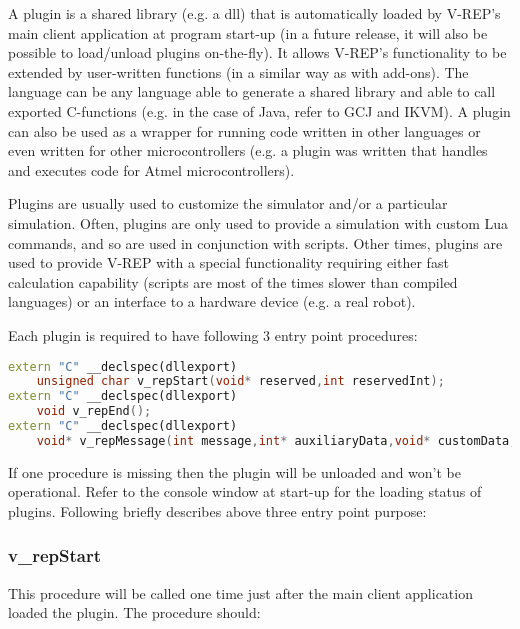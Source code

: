 \label{plugins}

A plugin is a shared library (e.g. a dll) that is automatically loaded by 
V-REP's main client application at program start-up (in a future release, it 
will also be possible to load/unload plugins on-the-fly). It allows V-REP's
functionality to be extended by user-written functions (in a similar way as 
with add-ons). The language can be any language able to generate a shared 
library and able to call exported C-functions (e.g. in the case of Java, 
refer to GCJ and IKVM). A plugin can also be used as a wrapper for running 
code written in other languages or even written for other microcontrollers 
(e.g. a plugin was written that handles and executes code for Atmel 
microcontrollers).

Plugins are usually used to customize the simulator and/or a particular 
simulation. Often, plugins are only used to provide a simulation with custom
Lua commands, and so are used in conjunction with scripts. Other times, 
plugins are used to provide V-REP with a special functionality requiring 
either fast calculation capability (scripts are most of the times slower 
than compiled languages) or an interface to a hardware device (e.g. a real 
robot).

Each plugin is required to have following 3 entry point procedures:
\begin{lstlisting}[language=C++]
extern "C" __declspec(dllexport)
	unsigned char v_repStart(void* reserved,int reservedInt);
extern "C" __declspec(dllexport)
	void v_repEnd();
extern "C" __declspec(dllexport)
	void* v_repMessage(int message,int* auxiliaryData,void* customData,int* replyData);
\end{lstlisting}

If one procedure is missing then the plugin will be unloaded and won't be 
operational. Refer to the console window at start-up for the loading status 
of plugins. Following briefly describes above three entry point purpose:

\subsubsection{v\_repStart}

This procedure will be called one time just after the main client application 
loaded the plugin. The procedure should:


